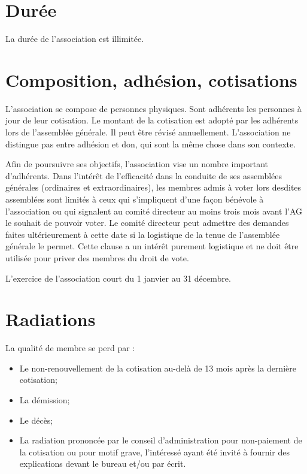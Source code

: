 \documentclass[11 pt]{article}
\begin{document}
\section{Durée}

La durée de l’association est illimitée.

\section{Composition, adhésion, cotisations}

L’association se compose de personnes physiques. Sont adhérents les
personnes à jour de leur cotisation.  Le montant de la cotisation est
adopté par les adhérents lors de l’assemblée générale. Il peut être
révisé annuellement.  L’association ne distingue pas entre adhésion et
don, qui sont la même chose dans son contexte.

Afin de poursuivre ses objectifs, l’association vise un nombre
important d’adhérents.  Dans l’intérêt de l’efficacité dans la conduite
de ses assemblées générales (ordinaires et extraordinaires), les membres
admis à voter lors desdites assemblées sont limités à ceux qui s’impliquent
d’une façon bénévole à l’association ou qui signalent au comité
directeur au moins trois mois avant l’AG le souhait de pouvoir voter.
Le comité directeur peut admettre des demandes faites ultérieurement à
cette date si la logistique de la tenue de l’assemblée générale le
permet.  Cette clause a un intérêt purement logistique et ne doit être
utilisée pour priver des membres du droit de vote.

L’exercice de l’association court du 1\ier{} janvier au 31 décembre.

\section{Radiations}

La qualité de membre se perd par :

\begin{itemize}
\item Le non-renouvellement de la cotisation au-delà de 13 mois après la dernière cotisation;
\item La démission;
\item Le décès;
\item La radiation prononcée par le conseil d’administration pour
  non-paiement de la cotisation ou pour motif grave, l’intéressé ayant
  été invité à fournir des explications devant le bureau et/ou par
  écrit.
\end{itemize}
\end{document}
